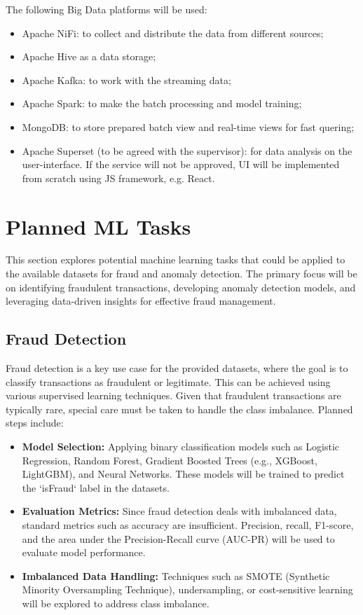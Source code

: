 \documentclass[12pt,a4paper, hidelinks]{article}
\begin{document}
The following Big Data platforms will be used:
\begin{itemize}
    \item Apache NiFi: to collect and distribute the data from different sources;
    \item Apache Hive as a data storage;
    \item Apache Kafka: to work with the streaming data;
    \item Apache Spark: to make the batch processing and model training;
    \item MongoDB: to store prepared batch view and real-time views for fast quering;
    \item Apache Superset (to be agreed with the supervisor): for data analysis on the user-interface. If the service will not be approved, UI will be implemented from scratch using JS framework, e.g. React.
\end{itemize}

\section{Planned ML Tasks}

This section explores potential machine learning tasks that could be applied to the available datasets for fraud and anomaly detection. The primary focus will be on identifying fraudulent transactions, developing anomaly detection models, and leveraging data-driven insights for effective fraud management. 

\subsection{Fraud Detection}
Fraud detection is a key use case for the provided datasets, where the goal is to classify transactions as fraudulent or legitimate. This can be achieved using various supervised learning techniques. Given that fraudulent transactions are typically rare, special care must be taken to handle the class imbalance. Planned steps include:
\begin{itemize}
    \item \textbf{Model Selection:} Applying binary classification models such as Logistic Regression, Random Forest, Gradient Boosted Trees (e.g., XGBoost, LightGBM), and Neural Networks. These models will be trained to predict the `isFraud` label in the datasets.
    \item \textbf{Evaluation Metrics:} Since fraud detection deals with imbalanced data, standard metrics such as accuracy are insufficient. Precision, recall, F1-score, and the area under the Precision-Recall curve (AUC-PR) will be used to evaluate model performance.
    \item \textbf{Imbalanced Data Handling:} Techniques such as SMOTE (Synthetic Minority Oversampling Technique), undersampling, or cost-sensitive learning will be explored to address class imbalance.
\end{itemize}
\end{document}
